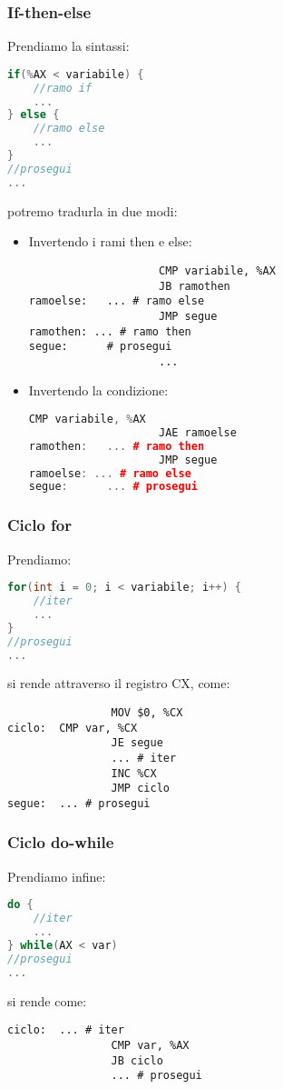 \documentclass[a4paper,11pt]{article}
\begin{document}
\subsubsection{If-then-else}
Prendiamo la sintassi:
\begin{lstlisting}[language=C++, style=codestyle]	
if(%AX < variabile) {
	//ramo if
	...
} else {
	//ramo else
	...
}
//prosegui
...
\end{lstlisting}
potremo tradurla in due modi:
\begin{itemize}
	\item Invertendo i rami then e else:
\begin{lstlisting}	
					CMP variabile, %AX
					JB ramothen
ramoelse:	... # ramo else
					JMP segue
ramothen: ... # ramo then
segue:		# prosegui
					...
\end{lstlisting}
	\item Invertendo la condizione:
\begin{lstlisting}[language=C++, style=codestyle]	
					CMP variabile, %AX
					JAE ramoelse
ramothen:	... # ramo then
					JMP segue
ramoelse: ... # ramo else
segue:		... # prosegui
\end{lstlisting}
\end{itemize}

\subsubsection{Ciclo for}
Prendiamo:
\begin{lstlisting}[language=C++, style=codestyle]	
for(int i = 0; i < variabile; i++) {
	//iter
	...
}
//prosegui
...
\end{lstlisting}
si rende attraverso il registro CX, come:
\begin{lstlisting}	
				MOV $0, %CX
ciclo:	CMP var, %CX
				JE segue
				...	# iter
				INC %CX
				JMP ciclo
segue:	... # prosegui
\end{lstlisting}

\subsubsection{Ciclo do-while}
Prendiamo infine:
\begin{lstlisting}[language=C++, style=codestyle]	
do {
	//iter
	...
} while(AX < var)
//prosegui
...
\end{lstlisting}
si rende come:
\begin{lstlisting}	
ciclo:	... # iter
				CMP var, %AX
				JB ciclo
				... # prosegui
\end{lstlisting}
\end{document}
